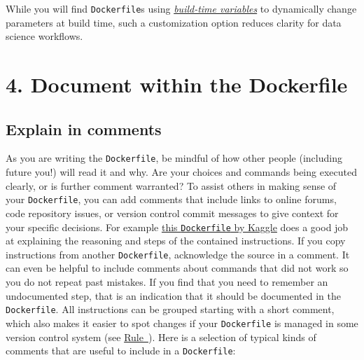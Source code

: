 \documentclass[10pt,letterpaper]{article}
\begin{document}
While you will find \texttt{Dockerfile}s using
\href{https://docs.docker.com/engine/reference/commandline/build/\#set-build-time-variables---build-arg}{\emph{build-time
variables}} to dynamically change parameters at build time, such a
customization option reduces clarity for data science workflows.

\hypertarget{document-within-the-dockerfile}{%
\section{4. Document within the
Dockerfile}\label{document-within-the-dockerfile}}

  \label{rule:document} 

\hypertarget{explain-in-comments}{%
\subsection{Explain in comments}\label{explain-in-comments}}

As you are writing the \texttt{Dockerfile}, be mindful of how other
people (including future you!) will read it and why. Are your choices
and commands being executed clearly, or is further comment warranted? To
assist others in making sense of your \texttt{Dockerfile}, you can add
comments that include links to online forums, code repository issues, or
version control commit messages to give context for your specific
decisions. For example
\href{https://github.com/Kaggle/docker-rstats/blob/master/Dockerfile}{this
\texttt{Dockerfile} by Kaggle} does a good job at explaining the
reasoning and steps of the contained instructions. If you copy
instructions from another \texttt{Dockerfile}, acknowledge the source in
a comment. It can even be helpful to include comments about commands
that did not work so you do not repeat past mistakes. If you find that
you need to remember an undocumented step, that is an indication that it
should be documented in the \texttt{Dockerfile}. All instructions can be
grouped starting with a short comment, which also makes it easier to
spot changes if your \texttt{Dockerfile} is managed in some version
control system (see
\hyperref[{rule:publish}]{Rule~}). Here is a
selection of typical kinds of comments that are useful to include in a
\texttt{Dockerfile}:

\footnotesize
\end{document}
